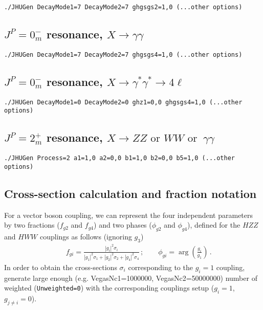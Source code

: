 \documentclass[aps,superscriptaddress,nofootinbib]{revtex4}
\begin{document}
\begin{verbatim}
./JHUGen DecayMode1=7 DecayMode2=7 ghgsgs2=1,0 (...other options)
\end{verbatim}

\subsection{$J^P = 0^-_m$ resonance, $X \to \gamma \gamma$}
\label{sec:exD}

\begin{verbatim}
./JHUGen DecayMode1=7 DecayMode2=7 ghgsgs4=1,0 (...other options)
\end{verbatim}

\subsection{$J^P=0^-_m$ resonance, $X\to\gamma^*\gamma^*\to4\ell$}
\label{sec:exE}

\begin{verbatim}
./JHUGen DecayMode1=0 DecayMode2=0 ghz1=0,0 ghgsgs4=1,0 (...other options)
\end{verbatim}

\subsection{$J^P = 2^+_m$ resonance, $X \to ZZ\text{ or }WW\text{ or }~\gamma\gamma$}

\begin{verbatim}
./JHUGen Process=2 a1=1,0 a2=0,0 b1=1,0 b2=0,0 b5=1,0 (...other options)
\end{verbatim}

\subsection{Cross-section calculation and fraction notation}

For a vector boson coupling, we can represent the four independent parameters by two  fractions
($f_{g2}$ and $f_{g4}$) and two phases ($\phi_{g2}$ and $\phi_{g4}$), defined for the $HZZ$
and $HWW$ couplings as follows (ignoring $g_3$)
%
\begin{eqnarray}
&& f_{gi} =  \frac{|g^{}_{i}|^2\sigma_i}{|g^{}_{1}|^2\sigma_1+|g^{}_{2}|^2\sigma_2+|g^{}_{4}|^2\sigma_4}\,;
~~~~~~~~~
 \phi_{gi} = \arg\left(\frac{g_i}{g_1}\right)\,.
\nonumber
\label{eq:fractions}
\end{eqnarray}
%
In order to obtain the cross-sections $\sigma_i$ corresponding to the $g^{}_{i}=1$ coupling,
generate large enough (e.g. VegasNc1=1000000, VegasNc2=50000000) number of weighted
({\tt Unweighted=0}) with the corresponding couplings setup ($g^{}_{i}=1$, $g^{}_{j\ne i}=0$).
\end{document}
